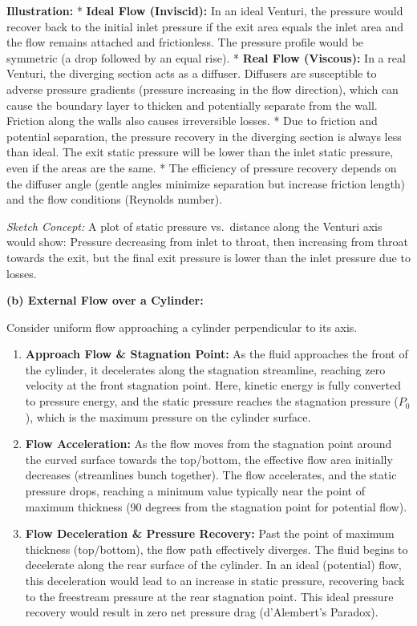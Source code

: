\textbf{Illustration:} * \textbf{Ideal Flow (Inviscid):} In an ideal
Venturi, the pressure would recover back to the initial inlet pressure
if the exit area equals the inlet area and the flow remains attached and
frictionless. The pressure profile would be symmetric (a drop followed
by an equal rise). * \textbf{Real Flow (Viscous):} In a real Venturi,
the diverging section acts as a diffuser. Diffusers are susceptible to
adverse pressure gradients (pressure increasing in the flow direction),
which can cause the boundary layer to thicken and potentially separate
from the wall. Friction along the walls also causes irreversible losses.
* Due to friction and potential separation, the pressure recovery in the
diverging section is always less than ideal. The exit static pressure
will be lower than the inlet static pressure, even if the areas are the
same. * The efficiency of pressure recovery depends on the diffuser
angle (gentle angles minimize separation but increase friction length)
and the flow conditions (Reynolds number).

\emph{Sketch Concept:} A plot of static pressure vs.~distance along the
Venturi axis would show: Pressure decreasing from inlet to throat, then
increasing from throat towards the exit, but the final exit pressure is
lower than the inlet pressure due to losses.

\textbf{(b) External Flow over a Cylinder:}

Consider uniform flow approaching a cylinder perpendicular to its axis.

\begin{enumerate}
\def\labelenumi{\arabic{enumi}.}
\tightlist
\item
  \textbf{Approach Flow \& Stagnation Point:} As the fluid approaches
  the front of the cylinder, it decelerates along the stagnation
  streamline, reaching zero velocity at the front stagnation point.
  Here, kinetic energy is fully converted to pressure energy, and the
  static pressure reaches the stagnation pressure (\(P_0\)), which is
  the maximum pressure on the cylinder surface.
\item
  \textbf{Flow Acceleration:} As the flow moves from the stagnation
  point around the curved surface towards the top/bottom, the effective
  flow area initially decreases (streamlines bunch together). The flow
  accelerates, and the static pressure drops, reaching a minimum value
  typically near the point of maximum thickness (90 degrees from the
  stagnation point for potential flow).
\item
  \textbf{Flow Deceleration \& Pressure Recovery:} Past the point of
  maximum thickness (top/bottom), the flow path effectively diverges.
  The fluid begins to decelerate along the rear surface of the cylinder.
  In an ideal (potential) flow, this deceleration would lead to an
  increase in static pressure, recovering back to the freestream
  pressure at the rear stagnation point. This ideal pressure recovery
  would result in zero net pressure drag (d'Alembert's Paradox).
\end{enumerate}

